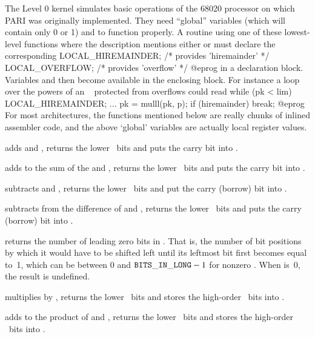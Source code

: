 The Level 0 kernel simulates basic operations of the 68020 processor on which
PARI was originally implemented. They need ``global''  variables
 (which will contain only 0 or 1) and  to
function properly. A routine using one of these lowest-level functions
where the description mentions either  or 
must declare the corresponding
\bprog
  LOCAL_HIREMAINDER;  /* provides 'hiremainder' */
  LOCAL_OVERFLOW;     /* provides 'overflow' */
@eprog\noindent
in a declaration block. Variables  and  then
become available in the enclosing block. For instance a loop over the powers
of an ~ protected from overflows could read
\bprog
 while (pk < lim)
 {
   LOCAL_HIREMAINDER;
   ...
   pk = mulll(pk, p); if (hiremainder) break;
 }
@eprog\noindent
For most architectures, the functions mentioned below are really chunks of
inlined assembler code, and the above `global' variables are actually
local register values.

 adds  and , returns the
lower \B\ bits and puts the carry bit into .

 adds  to the sum of the
 and , returns the lower \B\ bits and puts the carry bit into
.

 subtracts  and , returns
the lower \B\ bits and put the carry (borrow) bit into .

 subtracts  from the
difference of  and , returns the lower \B\ bits and puts the
carry (borrow) bit into .

 returns the number of leading zero bits in .
That is, the number of bit positions by which it would have to be shifted
left until its leftmost bit first becomes equal to~1, which can be between 0
and ${\tt BITS\_IN\_LONG}-1$ for nonzero . When  is~0, the result is undefined.

 multiplies  by , returns
the lower \B\ bits and stores the high-order \B\ bits into .

 adds  to the product
of  and , returns the lower \B\ bits and stores the high-order
\B\ bits into .

